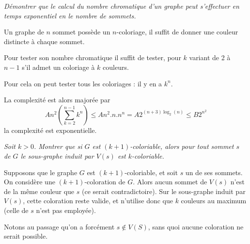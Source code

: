 \begin{Exercise}\it 
Démontrer que le calcul du nombre chromatique d'un graphe peut s'effectuer en temps exponentiel en le nombre de sommets. 
\end{Exercise} 
\begin{Answer}
Un graphe de $n$ sommet possède un $n$-coloriage, il suffit de donner une couleur distincte à chaque sommet.

Pour tester son nombre chromatique il suffit de tester, pour $k$ variant de 2 à $n-1$ s'il admet un coloriage à $k$ couleurs. 

Pour cela on peut tester tous les coloriages : il y en a $k^n$.

La complexité est alors majorée par 
\[An^2\left(\sum_{k=2}^{n-1} k^n\right) \le An^2.n.n^n= A2^{(n+3)\log_2(n)} \le B2^{n^2}\]
la complexité est exponentielle.
\end{Answer}
\begin{Exercise}\it  
Soit $k >0$. Montrer que si $G$ est $(k+1)$-coloriable, alors pour tout sommet $s$ de $G$ le sous-graphe induit par $V(s)$ est $k$-coloriable. 
\end{Exercise} 
\begin{Answer}
Supposons que le graphe $G$ est $(k+1)$-coloriable, et soit $s$ un de ses sommets. On considère une $(k+1)$-coloration de $G$. Alors aucun sommet de $V(s)$ n'est de la même couleur que $s$ (ce serait contradictoire). Sur le sous-graphe induit par $V(s)$, cette coloration reste valide, et n'utilise donc que $k$ couleurs au maximum (celle de $s$ n'est pas employée). 

Notons au passage qu'on a forcément $s \notin V(S)$, sans quoi aucune coloration ne serait possible.
\end{Answer}
